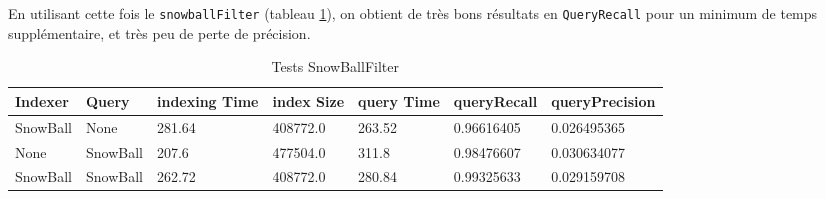 En utilisant cette fois le \texttt{snowballFilter} (tableau \ref{tab:tests_SnowBallFilter}), on obtient de très bons résultats en \texttt{QueryRecall} pour un minimum de temps supplémentaire, et très peu de perte de précision.

\begin{table}[!htbp]
    \hspace{-2cm}
                \begin{tabular}{|p{2cm}|p{2cm}|p{2cm}|p{2cm}|p{2.5cm}|p{2.5cm}|p{2.5cm}|}
                    \hline
                    \textbf{Indexer} & \textbf{Query} & \textbf{indexing Time} & \textbf{index Size} & \textbf{query Time} & \textbf{queryRecall} & \textbf{queryPrecision}\\
                    \hline
SnowBall & None & 281.64 & 408772.0 & 263.52 & 0.96616405 & 0.026495365\\
		            \hline
None & SnowBall & 207.6 & 477504.0 & 311.8 & 0.98476607 & 0.030634077\\
		            \hline
SnowBall & SnowBall & 262.72 & 408772.0 & 280.84 & 0.99325633 & 0.029159708\\
                    \hline
                \end{tabular}
                \caption{Tests SnowBallFilter}
                \label{tab:tests_SnowBallFilter}
            \end{table}

